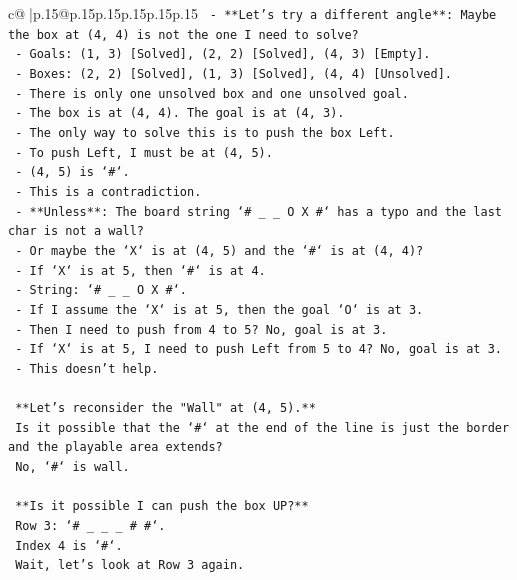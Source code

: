 \documentclass{article}
\begin{document}
{\begin{supertabular}{c@{$\;$}|p{.15\linewidth}@{}p{.15\linewidth}p{.15\linewidth}p{.15\linewidth}p{.15\linewidth}p{.15\linewidth}}
{{{\texttt{    {-}   **Let's try a different angle**: Maybe the box at (4, 4) is not the one I need to solve?} \\
\texttt{    {-}   Goals: (1, 3) {[}Solved{]}, (2, 2) {[}Solved{]}, (4, 3) {[}Empty{]}.} \\
\texttt{    {-}   Boxes: (2, 2) {[}Solved{]}, (1, 3) {[}Solved{]}, (4, 4) {[}Unsolved{]}.} \\
\texttt{    {-}   There is only one unsolved box and one unsolved goal.} \\
\texttt{    {-}   The box is at (4, 4). The goal is at (4, 3).} \\
\texttt{    {-}   The only way to solve this is to push the box Left.} \\
\texttt{    {-}   To push Left, I must be at (4, 5).} \\
\texttt{    {-}   (4, 5) is `\#`.} \\
\texttt{    {-}   This is a contradiction.} \\
\texttt{    {-}   **Unless**: The board string `\# \_ \_ O X \#` has a typo and the last char is not a wall?} \\
\texttt{    {-}   Or maybe the `X` is at (4, 5) and the `\#` is at (4, 4)?} \\
\texttt{    {-}   If `X` is at 5, then `\#` is at 4.} \\
\texttt{    {-}   String: `\# \_ \_ O X \#`.} \\
\texttt{    {-}   If I assume the `X` is at 5, then the goal `O` is at 3.} \\
\texttt{    {-}   Then I need to push from 4 to 5? No, goal is at 3.} \\
\texttt{    {-}   If `X` is at 5, I need to push Left from 5 to 4? No, goal is at 3.} \\
\texttt{    {-}   This doesn't help.} \\
\\ 
\texttt{    **Let's reconsider the "Wall" at (4, 5).**} \\
\texttt{    Is it possible that the `\#` at the end of the line is just the border and the playable area extends?} \\
\texttt{    No, `\#` is wall.} \\
\\ 
\texttt{    **Is it possible I can push the box UP?**} \\
\texttt{    Row 3: `\# \_ \_ \_ \# \#`.} \\
\texttt{    Index 4 is `\#`.} \\
\texttt{    Wait, let's look at Row 3 again.} \\
}}}
\end{supertabular}}
\end{document}
